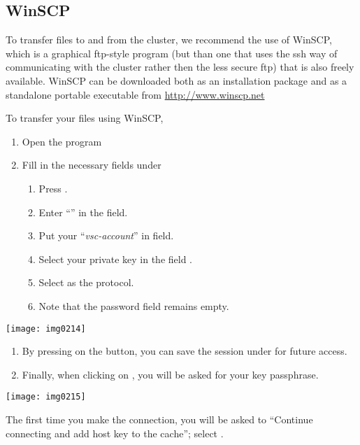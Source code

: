 \ifwindows
  \subsection{WinSCP}

  To transfer files to and from the cluster, we recommend the use of WinSCP,
  which is a graphical ftp-style program (but than one that uses the ssh way of
  communicating with the cluster rather then the less secure ftp) that is also
  freely available. WinSCP can be downloaded both as an installation package
  and as a standalone portable executable from \url{http://www.winscp.net}

  To transfer your files using WinSCP,

  \begin{enumerate}
  \item  Open the program
  \item  Fill in the necessary fields under 
  \begin{enumerate}
  \item  Press .
  \item  Enter ``\emph{\loginnode}'' in the  field.
  \item  Put your ``\emph{vsc-account}'' in  field.
  \item  Select your private key in the field .
  \item  Select  as the  protocol.
  \item  Note that the password field remains empty.
  \end{enumerate}
  \end{enumerate}

  \texttt{[image: img0214]}

  \begin{enumerate}
  \item  By pressing on the  button, you can save the session under
          for future access.
  \item  Finally, when clicking on , you will be asked for your key passphrase.
  \end{enumerate}

  \texttt{[image: img0215]}

  The first time you make the connection, you will be asked to ``Continue
  connecting and add host key to the cache''; select .

